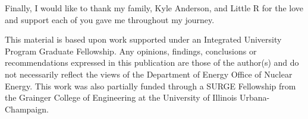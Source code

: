 Finally, I would like to thank my family, Kyle Anderson, and Little R
for the love and support each of you gave me throughout my journey. 

This material is based upon work supported under an Integrated University 
Program Graduate Fellowship. Any opinions, findings, conclusions or 
recommendations expressed in this publication are those of the author(s) 
and do not necessarily reflect the views of the Department of Energy Office 
of Nuclear Energy. This work was also partially funded through a SURGE 
Fellowship from the Grainger College of Engineering at the University of 
Illinois Urbana-Champaign.